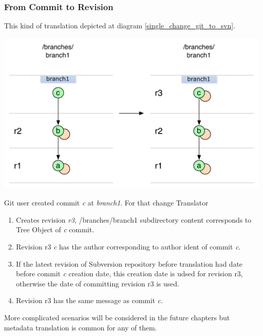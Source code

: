 \subsubsection{From Commit to Revision}
This kind of translation depicted at diagram \ref{single_change_git_to_svn}.
\begin{center}
\includegraphics[width=\textwidth]{img/diagrams/single_change_git_to_svn.pdf}%
\label{single_change_git_to_svn}%
\end{center}

Git user created commit \emph{c} at \emph{branch1}. For that change Translator
\begin{enumerate}
	\compactlist
	\item Creates revision \emph{r3}, /branches/branch1 subdirectory content corresponds to Tree Object of \emph{c} commit.
	\item Revision r3 \emph{c} has the author corresponding to author ident of commit \emph{c}.
	\item If the latest revision of Subversion repository before translation had date before commit \emph{c} creation date, this creation date is udsed for revision r3, otherwise the date of committing revision r3 is used.
	\item Revision r3 has the same message as commit \emph{c}.
\end{enumerate}

More complicated scenarios will be considered in the future chapters but metadata translation is common for any of them.